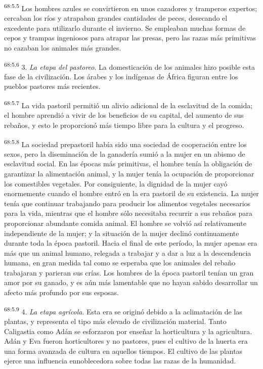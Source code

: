 \documentclass[twoside, 11pt]{book}
\begin{document}
\par
\textsuperscript{68:5.5} Los hombres azules se convirtieron en unos cazadores y tramperos expertos; cercaban los ríos y atrapaban grandes cantidades de peces, desecando el excedente para utilizarlo durante el invierno. Se empleaban muchas formas de cepos y trampas ingeniosos para atrapar las presas, pero las razas más primitivas no cazaban los animales más grandes.

\par
\textsuperscript{68:5.6} 3. \textit{La etapa del pastoreo}. La domesticación de los animales hizo posible esta fase de la civilización. Los árabes y los indígenas de África figuran entre los pueblos pastores más recientes.

\par
\textsuperscript{68:5.7} La vida pastoril permitió un alivio adicional de la esclavitud de la comida; el hombre aprendió a vivir de los beneficios de su capital, del aumento de sus rebaños, y esto le proporcionó más tiempo libre para la cultura y el progreso.

\par
\textsuperscript{68:5.8} La sociedad prepastoril había sido una sociedad de cooperación entre los sexos, pero la diseminación de la ganadería sumió a la mujer en un abismo de esclavitud social. En las épocas más primitivas, el hombre tenía la obligación de garantizar la alimentación animal, y la mujer tenía la ocupación de proporcionar los comestibles vegetales. Por consiguiente, la dignidad de la mujer cayó enormemente cuando el hombre entró en la era pastoril de su existencia. La mujer tenía que continuar trabajando para producir los alimentos vegetales necesarios para la vida, mientras que el hombre sólo necesitaba recurrir a sus rebaños para proporcionar abundante comida animal. El hombre se volvió así relativamente independiente de la mujer; y la situación de la mujer declinó continuamente durante toda la época pastoril. Hacia el final de este período, la mujer apenas era más que un animal humano, relegada a trabajar y a dar a luz a la descendencia humana, en gran medida tal como se esperaba que los animales del rebaño trabajaran y parieran sus crías. Los hombres de la época pastoril tenían un gran amor por su ganado, y es aún más lamentable que no hayan sabido desarrollar un afecto más profundo por sus esposas.

\par
\textsuperscript{68:5.9} 4. \textit{La etapa agrícola}. Esta era se originó debido a la aclimatación de las plantas, y representa el tipo más elevado de civilización material. Tanto Caligastia como Adán se esforzaron por enseñar la horticultura y la agricultura. Adán y Eva fueron horticultores y no pastores, pues el cultivo de la huerta era una forma avanzada de cultura en aquellos tiempos. El cultivo de las plantas ejerce una influencia ennoblecedora sobre todas las razas de la humanidad.
\end{document}
